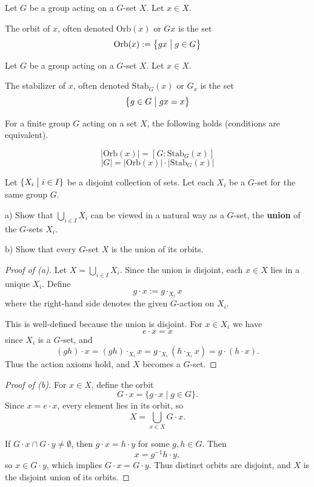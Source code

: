  \begin{defn}[Orbit]
     Let $G$ be a group acting on a $G$-set $X$. Let $x \in X$.  

     The orbit of $x$, often denoted $\text{Orb}(x)$ or $Gx$ 
     is the set 
     \[
        \text{Orb}(x) := \left\{gx \bigm| g \in G\right\}
     \]
 \end{defn} 
 \begin{defn}[Stabilizer]
     Let $G$ be a group acting on a $G$-set $X$. Let $x \in X$. 

     The stabilizer of $x$, often denoted $\text{Stab}_G(x)$ 
     or $G_x$ is the set 
     \[
         \left\{g \in G \bigm| gx = x\right\}
     \]
 \end{defn}
 \newpage 
 \begin{thm}
     For a finite group $G$ acting on a set $X$, the following 
     holds (conditions are equivalent). 

     \[
         |\text{Orb}(x)| = [G : \text{Stab}_G(x)]
     \]
     \[
         |G| = |\text{Orb}(x)| \cdot |\text{Stab}_G(x)|
     \]
 \end{thm}
 \begin{prob}
     Let $\{X_i \bigm| i \in I\}$ be a disjoint collection of 
     sets. Let each $X_i$ be a $G$-set for the same group $G$. 
    
     a) Show that $\bigcup_{i\in I}X_i$ can be viewed in a 
     natural way as a $G$-set, the \textbf{union} of the $G$-sets 
     $X_i$. 

     b) Show that every $G$-set $X$ is the union of its orbits. 
 \end{prob}
 \begin{proof}[Proof of (a)]
     Let $X=\bigcup_{i\in I}X_i$. Since the union is disjoint, each
     $x\in X$ lies in a unique $X_i$. Define
     \[
         g\cdot x := g\cdot_{X_i} x
     \]
     where the right-hand side denotes the given $G$-action on $X_i$.

     This is well-defined because the union is disjoint.
     For $x\in X_i$ we have
     \[
         e\cdot x = x
     \]
     since $X_i$ is a $G$-set, and
     \[
         (gh)\cdot x
         = (gh)\cdot_{X_i} x
         = g\cdot_{X_i}(h\cdot_{X_i}x)
         = g\cdot(h\cdot x).
     \]
     Thus the action axioms hold, and $X$ becomes a $G$-set.
 \end{proof}
 \begin{proof}[Proof of (b)]
     For $x\in X$, define the orbit
     \[
         G\cdot x = \{ g\cdot x \mid g\in G\}.
     \]
     Since $x=e\cdot x$, every element lies in its orbit,
     so
     \[
         X = \bigcup_{x\in X} G\cdot x.
     \]

     If $G\cdot x \cap G\cdot y \neq \emptyset$, then
     $g\cdot x = h\cdot y$ for some $g,h\in G$.
     Then
     \[
         x = g^{-1}h\cdot y,
     \]
     so $x\in G\cdot y$, which implies
     $G\cdot x = G\cdot y$.
     Thus distinct orbits are disjoint, and $X$ is the
     disjoint union of its orbits.
 \end{proof}
